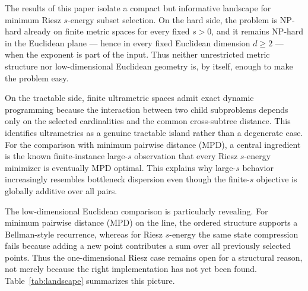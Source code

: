 \documentclass[11pt]{article}
\begin{document}
The results of this paper isolate a compact but informative landscape for minimum Riesz $s$-energy subset selection. On the hard side, the problem is NP-hard already on finite metric spaces for every fixed $s>0$, and it remains NP-hard in the Euclidean plane --- hence in every fixed Euclidean dimension $d\ge 2$ --- when the exponent is part of the input. Thus neither unrestricted metric structure nor low-dimensional Euclidean geometry is, by itself, enough to make the problem easy.

On the tractable side, finite ultrametric spaces admit exact dynamic programming because the interaction between two child subproblems depends only on the selected cardinalities and the common cross-subtree distance. This identifies ultrametrics as a genuine tractable island rather than a degenerate case. For the comparison with minimum pairwise distance (MPD), a central ingredient is the known finite-instance large-$s$ observation that every Riesz $s$-energy minimizer is eventually MPD optimal. This explains why large-$s$ behavior increasingly resembles bottleneck dispersion even though the finite-$s$ objective is globally additive over all pairs.

The low-dimensional Euclidean comparison is particularly revealing. For minimum pairwise distance (MPD) on the line, the ordered structure supports a Bellman-style recurrence, whereas for Riesz $s$-energy the same state compression fails because adding a new point contributes a sum over all previously selected points. Thus the one-dimensional Riesz case remains open for a structural reason, not merely because the right implementation has not yet been found. Table~\ref{tab:landscape} summarizes this picture.
\end{document}
